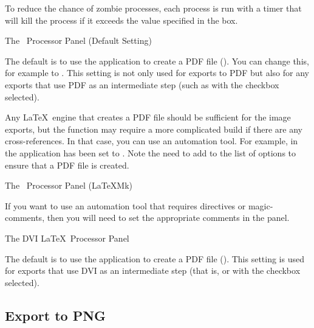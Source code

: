 
To reduce the chance of zombie processes, each process is run with a
timer that will kill the process if it exceeds the value specified
in the  box.


 {}
 {The \pdfLaTeX\ Processor Panel (Default Setting)}

The default is to use the  application to create a PDF
file (). You can change this, for example to .
This setting is not only used for exports to PDF but also for any
exports that use PDF as an intermediate step (such as
 with the  checkbox
selected).

Any \LaTeX\ engine that creates a PDF file should be sufficient for
the image exports, but the  function may
require a more complicated build if there are any cross-references.
In that case, you can use an automation tool. For example, in
 the application has been set to
. Note the need to add  to the list of
options to ensure that a PDF file is created.

 {}
 {The \pdfLaTeX\ Processor Panel (LaTeXMk)}

If you want to use an automation tool that requires \glspl{directive}
or \glspl{magic-comment}, then you will need to set the appropriate
comments in the 
panel.


 {}
 {The DVI \LaTeX\ Processor Panel}

The default is to use the  application to create a PDF
file ().  This setting is used for exports
that use DVI as an intermediate step (that is, 
or  with the  checkbox
selected).

\subsection{Export to PNG}\label{sec:exportpng}


